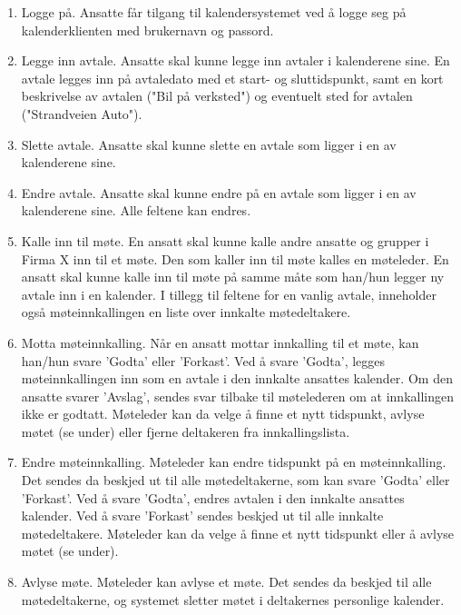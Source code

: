 \begin{enumerate}

\item
Logge på. Ansatte får tilgang til kalendersystemet ved å logge seg på kalenderklienten med brukernavn og passord.

\item
Legge inn avtale. Ansatte skal kunne legge inn avtaler i kalenderene sine. En avtale legges inn på avtaledato med et start- og sluttidspunkt, samt en kort beskrivelse av avtalen ("Bil på verksted") og eventuelt sted for avtalen ("Strandveien Auto").

\item
Slette avtale. Ansatte skal kunne slette en avtale som ligger i en av kalenderene sine.

\item
Endre avtale. Ansatte skal kunne endre på en avtale som ligger i en av kalenderene sine. Alle feltene kan endres.

\item
Kalle inn til møte. En ansatt skal kunne kalle andre ansatte og grupper i Firma X inn til et møte. Den som kaller inn til møte kalles en møteleder. En ansatt skal kunne kalle inn til møte på samme måte som han/hun legger ny avtale inn i en kalender. I tillegg til feltene for en vanlig avtale, inneholder også møteinnkallingen en liste over innkalte møtedeltakere. 

\item
Motta møteinnkalling. Når en ansatt mottar innkalling til et møte, kan han/hun svare 'Godta' eller 'Forkast'. Ved å svare 'Godta', legges møteinnkallingen inn som en avtale i den innkalte ansattes kalender. Om den ansatte svarer 'Avslag', sendes svar tilbake til møtelederen om at innkallingen ikke er godtatt. Møteleder kan da velge å finne et nytt tidspunkt, avlyse møtet (se under) eller fjerne deltakeren fra innkallingslista.

\item
Endre møteinnkalling. Møteleder kan endre tidspunkt på en møteinnkalling. Det sendes da beskjed ut til alle møtedeltakerne, som kan svare 'Godta' eller 'Forkast'. Ved å svare 'Godta', endres avtalen i den innkalte ansattes kalender. Ved å svare 'Forkast' sendes beskjed ut til alle innkalte møtedeltakere. Møteleder kan da velge å finne et nytt tidspunkt eller å avlyse møtet (se under).

\item
Avlyse møte. Møteleder kan avlyse et møte. Det sendes da beskjed til alle møtedeltakerne, og systemet sletter møtet i deltakernes personlige kalender.


\end{enumerate}
